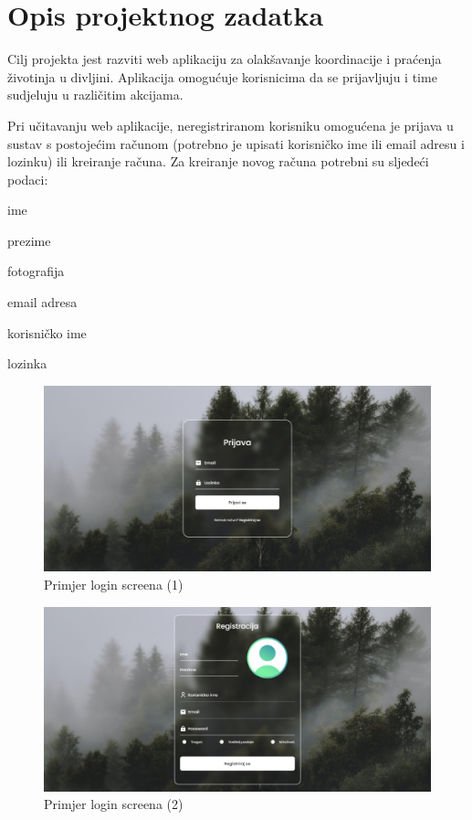 \chapter{Opis projektnog zadatka}
		
		Cilj projekta jest razviti web aplikaciju za olakšavanje koordinacije i praćenja životinja u divljini. Aplikacija omogućuje korisnicima da se prijavljuju i time sudjeluju u različitim akcijama.
		
		Pri učitavanju web aplikacije, neregistriranom korisniku omogućena je prijava u sustav s postojećim računom (potrebno je upisati korisničko ime ili email adresu i lozinku) ili kreiranje računa. Za kreiranje novog računa potrebni su sljedeći podaci:
		\begin{packed_item}
			\item ime
			\item prezime
			\item fotografija
			\item email adresa
			\item korisničko ime
			\item lozinka
		\end{packed_item}
		
		\begin{figure}[H]
			\includegraphics[scale=0.5]{slike/login_screen.PNG} %
			\centering
			\caption{Primjer login screena (1)}
			\label{fig:promjene}
		\end{figure}
		
		\begin{figure}[H]
			\includegraphics[scale=0.35]{slike/login_screen2.PNG} %
			\centering
			\caption{Primjer login screena (2)}
			\label{fig:promjene}
		\end{figure}
		
